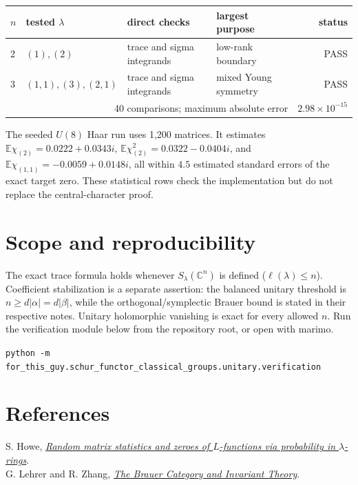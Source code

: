 \documentclass[11pt]{article}
\begin{document}
\begin{center}\begin{tabular}{@{}llllr@{}}\toprule
$n$ & tested $\lambda$ & direct checks & largest purpose & status\\\midrule
2 & $(1),(2)$ & trace and sigma integrands & low-rank boundary & PASS\\
3 & $(1,1),(3),(2,1)$ & trace and sigma integrands & mixed Young symmetry & PASS\\\midrule
\multicolumn{4}{r}{40 comparisons; maximum absolute error} & $2.98\times10^{-15}$\\\bottomrule
\end{tabular}\end{center}

\clearpage
The seeded $U(8)$ Haar run uses 1,200 matrices. It estimates $\mathbb E\chi_{(2)}=0.0222+0.0343i$, $\mathbb E\chi_{(2)}^2=0.0322-0.0404i$, and $\mathbb E\chi_{(1,1)}=-0.0059+0.0148i$, all within $4.5$ estimated standard errors of the exact target zero. These statistical rows check the implementation but do not replace the central-character proof.

\section{Scope and reproducibility}
The exact trace formula holds whenever $S_\lambda(\mathbb C^n)$ is defined ($\ell(\lambda)\le n$). Coefficient stabilization is a separate assertion: the balanced unitary threshold is $n\geq d|\alpha|=d|\beta|$, while the orthogonal/symplectic Brauer bound is stated in their respective notes.  Unitary holomorphic vanishing is exact for every allowed $n$. Run the verification module below from the repository root, or open  with marimo.
\begin{center}\footnotesize\texttt{python -m for\_this\_guy.schur\_functor\_classical\_groups.unitary.verification}\end{center}

\section*{References}
S. Howe, \href{https://arxiv.org/abs/2412.19295}{\emph{Random matrix statistics and zeroes of $L$-functions via probability in $\lambda$-rings}}.\\
G. Lehrer and R. Zhang, \href{https://arxiv.org/abs/1207.5889}{\emph{The Brauer Category and Invariant Theory}}.
\end{document}
